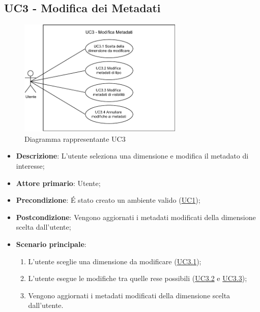 \subsection{UC3 - Modifica dei Metadati}
\label{sub:uc3}

\begin{figure}[h]
    \centering
    \includegraphics[width=0.7\textwidth]{componenti/casi-duso/diagrammi/UC3.pdf}
    \caption{Diagramma rappresentante UC3}
    \label{fig:UC3}
\end{figure}

\begin{itemize}
    \item \textbf{Descrizione}: L’utente seleziona una dimensione e modifica il metadato di interesse;
	
    \item \textbf{Attore primario}: Utente;
    
    \item \textbf{Precondizione}:   É stato creato un ambiente valido (\hyperref[sub:uc1]{UC1});
    \item \textbf{Postcondizione}:  Vengono aggiornati i metadati modificati della dimensione scelta dall'utente;

	\item \textbf{Scenario principale}:
        \begin{enumerate}
                \item L'utente sceglie una dimensione da modificare (\hyperref[ssub:uc3.1]{UC3.1});
                \item L'utente esegue le modifiche tra quelle rese possibili (\hyperref[ssub:uc3.2]{UC3.2} e 
                \hyperref[ssub:uc3.3]{UC3.3});
                \item Vengono aggiornati i metadati modificati della dimensione scelta dall'utente.
        \end{enumerate}
\end{itemize}


